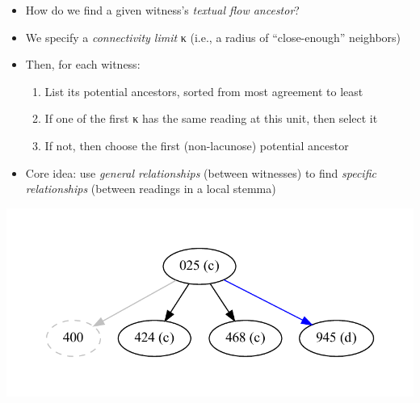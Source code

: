\documentclass[10pt]{beamer}
\begin{document}
	\begin{frame}
		\begin{itemize}
			\item How do we find a given witness's \emph{textual flow ancestor}?
			\item We specify a \emph{connectivity limit} \textgreek{κ} (i.e., a radius of ``close-enough'' neighbors)
			\item Then, for each witness:
			\begin{enumerate}
				\item List its potential ancestors, sorted from most agreement to least
				\item If one of the first \textgreek{κ} has the same reading at this unit, then select it
				\item If not, then choose the first (non-lacunose) potential ancestor
			\end{enumerate}
			\item Core idea: use \emph{general relationships} (between witnesses) to find \emph{specific relationships} (between readings in a local stemma)
		\end{itemize}
		\begin{center}
			\includegraphics[scale=0.5]{../img/B25K1V13U24-26-textual-flow-snapshot.pdf}
		\end{center}
	\end{frame}
\end{document}
